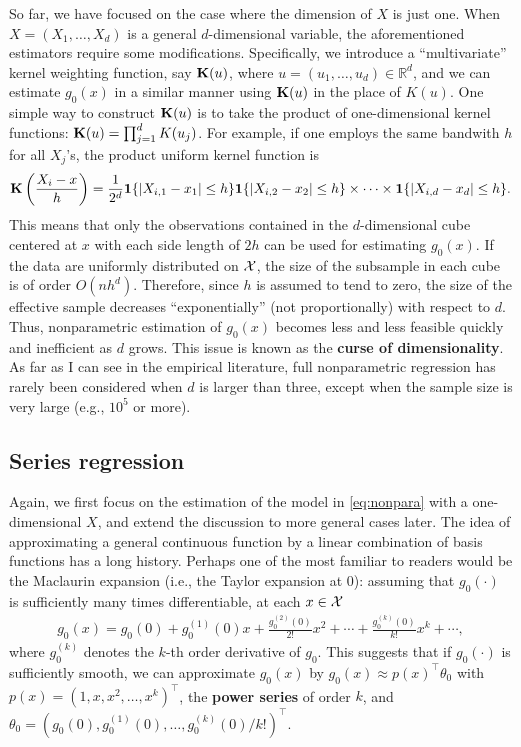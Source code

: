 \documentclass[11pt, A4paper, openany, uplatex]{book}
\begin{document}
\bigskip

So far, we have focused on the case where the dimension of $X$ is just one.
When $X = (X_1, \ldots, X_d)$ is a general $d$-dimensional variable, the aforementioned estimators require some modifications.
Specifically, we introduce a ``multivariate'' kernel weighting function, say $\mathbf{K}(u)$, where $u = (u_1, \ldots, u_d) \in \mathbb{R}^d$, and we can estimate $g_0(x)$ in a similar manner using $\mathbf{K}(u)$ in the place of $K(u)$.
One simple way to construct $\mathbf{K}(u)$ is to take the product of one-dimensional kernel functions: $\mathbf{K}(u) = \prod_{j=1}^d K(u_j)$.
For example, if one employs the same bandwith $h$ for all $X_j$'s, the product uniform kernel function is
\begin{align*}
	\mathbf{K}\left(\frac{X_i - x}{h}\right) = \frac{1}{2^d}\mathbf{1}\{|X_{i,1} - x_1| \le h\}\mathbf{1}\{|X_{i,2} - x_2| \le h\} \times \cdots \times \mathbf{1}\{|X_{i,d} - x_d| \le h\}.
\end{align*}
This means that only the observations contained in the $d$-dimensional cube centered at $x$ with each side length of $2h$ can be used for estimating $g_0(x)$.
If the data are uniformly distributed on $\mathcal{X}$, the size of the subsample in each cube is of order $O(nh^d)$.
Therefore, since $h$ is assumed to tend to zero, the size of the effective sample decreases ``exponentially'' (not proportionally) with respect to $d$.
Thus, nonparametric estimation of $g_0(x)$ becomes less and less feasible quickly and inefficient as $d$ grows.
This issue is known as the \textbf{curse of dimensionality}.
As far as I can see in the empirical literature, full nonparametric regression has rarely been considered when $d$ is larger than three, except when the sample size is very large (e.g., $10^5$ or more).

\subsection{Series regression}

Again, we first focus on the estimation of the model in \eqref{eq:nonpara} with a one-dimensional $X$, and extend the discussion to more general cases later.
The idea of approximating a general continuous function by a linear combination of basis functions has a long history.
Perhaps one of the most familiar to readers would be the Maclaurin expansion (i.e., the Taylor expansion at 0):
assuming that $g_0(\cdot)$ is sufficiently many times differentiable, at each $x \in \mathcal{X}$
\begin{align*}
	g_0(x) = g_0(0) + g_0^{(1)}(0)x + \frac{g_0^{(2)}(0)}{2!}x^2 + \cdots + \frac{g_0^{(k)}(0)}{k!}x^k + \cdots,
\end{align*}
where $g_0^{(k)}$ denotes the $k$-th order derivative of $g_0$.
This suggests that if $g_0(\cdot)$ is sufficiently smooth, we can approximate $g_0(x)$ by $g_0(x) \approx p(x)^\top \theta_0$ with $p(x) = (1, x, x^2, \ldots, x^k)^\top$, the \textbf{power series} of order $k$, and $\theta_0 = (g_0(0), g_0^{(1)}(0), \ldots, g_0^{(k)}(0)/k!)^\top$.
\end{document}
